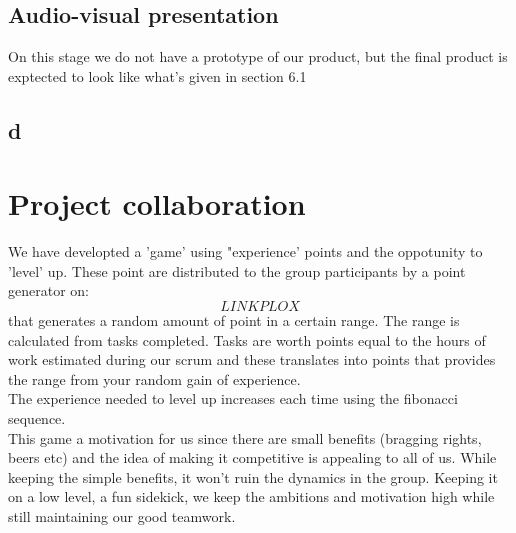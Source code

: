 \documentclass[12pt]{article}
\begin{document}
\subsection{Audio-visual presentation}
On this stage we do not have a prototype of our product, but the final product is exptected to look like what's given in section 6.1

\subsection{d}
 

\section{Project collaboration}
We have developted a 'game' using "experience' points and the oppotunity to 'level' up. These point are distributed to the group participants by a point generator on:
$$LINK PLOX$$
that generates a random amount of point in a certain range. The range is calculated from tasks completed. Tasks are worth points equal to the hours of work estimated during our scrum and these translates into points that provides the range from your random gain of experience.\\
The experience needed to level up increases each time using the fibonacci sequence.\\
This game a motivation for us since there are small benefits (bragging rights, beers etc) and the idea of making it competitive is appealing to all of us. While keeping the simple benefits, it won't ruin the dynamics in the group. Keeping it on a low level, a fun sidekick, we keep the ambitions and motivation high while still maintaining our good teamwork.
\end{document}
